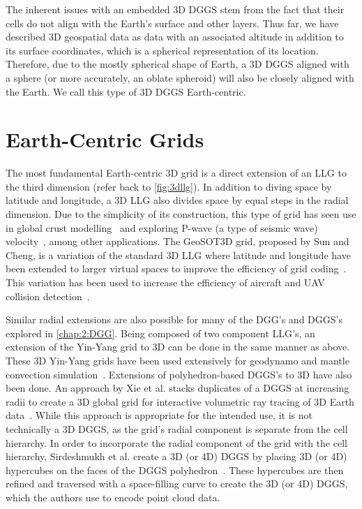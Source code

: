 The inherent issues with an embedded 3D DGGS stem from the fact that their cells do not align with the Earth's surface and other layers.
Thus far, we have described 3D geospatial data as data with an associated altitude in addition to its surface coordinates, which is a spherical representation of its location.
Therefore, due to the mostly spherical shape of Earth, a 3D DGGS aligned with a sphere (or more accurately, an oblate spheroid) will also be closely aligned with the Earth.
We call this type of 3D DGGS Earth-centric.


\section{Earth-Centric Grids} \label{chap:3:earthCentric}
The most fundamental Earth-centric 3D grid is a direct extension of an LLG to the third dimension (refer back to \cref{fig:3dllg}).
In addition to diving space by latitude and longitude, a 3D LLG also divides space by equal steps in the radial dimension.
Due to the simplicity of its construction, this type of grid has seen use in global crust modelling~\cite{bassin2000current} and exploring P-wave (a type of seismic wave) velocity~\cite{zhao2004global}, among other applications.
The GeoSOT3D grid, proposed by Sun and Cheng, is a variation of the standard 3D LLG where latitude and longitude have been extended to larger virtual spaces to improve the efficiency of grid coding~\cite{sun20153d}. This variation has been used to increase the efficiency of aircraft and UAV collision detection~\cite{miao2019low, zhai2019collision}.


Similar radial extensions are also possible for many of the DGG's and DGGS's explored in \cref{chap:2:DGG}.
Being composed of two component LLG's, an extension of the Yin-Yang grid to 3D can be done in the same manner as above.
These 3D Yin-Yang grids have been used extensively for geodynamo and mantle convection simulation~\cite{yoshida2004application, kageyama2005geodynamo, tackley2008modelling}.
Extensions of polyhedron-based DGGS's to 3D have also been done.
An approach by Xie et al. stacks duplicates of a DGGS at increasing radii to create a 3D global grid for interactive volumetric ray tracing of 3D Earth data~\cite{xie2013interactive}.
While this approach is appropriate for the intended use, it is not technically a 3D DGGS, as the grid's radial component is separate from the cell hierarchy.
In order to incorporate the radial component of the grid with the cell hierarchy, Sirdeshmukh et al. create a 3D (or 4D) DGGS by placing 3D (or 4D) hypercubes on the faces of the DGGS polyhedron~\cite{sirdeshmukh2019utilizing}.
These hypercubes are then refined and traversed with a space-filling curve to create the 3D (or 4D) DGGS, which the authors use to encode point cloud data.


